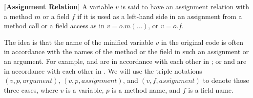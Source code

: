 \begin{definition}{\bf [Assignment Relation]}
  A variable $v$ is said to have an assignment relation with a method
  $m$ or a field $f$ if it is used as a left-hand side in an
  assignment from a method call or a field access as in $v =
  o.m(...)$, or $v = o.f$.
\end{definition}


%
%

The idea is that the name of the minified variable $v$ in the original
code is often in accordance with the names of the method or the field
in such an assignment or an argument. For example,  and
 are in accordance with each other in ; or  and
 are in accordance with each other in
.  We will use the
triple notations $(v, p, argument)$, $(v, p, assignment)$, and
$(v, f, assignment)$ to denote those three cases, where $v$ is a
variable, $p$ is a method name, and $f$ is a field name.




